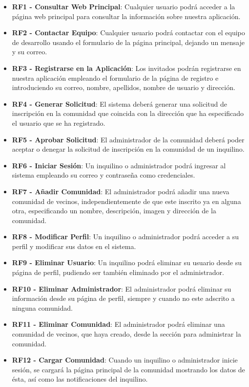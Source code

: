 \begin{itemize}
	\item \textbf{RF1 - Consultar Web Principal}: Cualquier usuario podrá acceder a la página web principal para consultar la información sobre nuestra aplicación.
	\item \textbf{RF2 - Contactar Equipo}: Cualquier usuario podrá contactar con el equipo de desarrollo usando el formulario de la página principal, dejando un mensaje y su correo.
	\item \textbf{RF3 - Registrarse en la Aplicación}: Los invitados podrán registrarse en nuestra aplicación empleando el formulario de la página de registro e introduciendo su correo, nombre, apellidos, nombre de usuario y dirección.
	\item \textbf{RF4 - Generar Solicitud}: El sistema deberá generar una solicitud de inscripción en la comunidad que coincida con la dirección que ha especificado el usuario que se ha registrado.
	\item \textbf{RF5 - Aprobar Solicitud}: El administrador de la comunidad deberá poder aceptar o denegar la solicitud de inscripción en la comunidad de un inquilino. 
	\item \textbf{RF6 - Iniciar Sesión}: Un inquilino o administrador podrá ingresar al sistema empleando su correo y contraseña como credenciales.
	\item \textbf{RF7 - Añadir Comunidad}: El administrador podrá añadir una nueva comunidad de vecinos, independientemente de que este inscrito ya en alguna otra, especificando un nombre, descripción, imagen y dirección de la comunidad.
	\item \textbf{RF8 - Modificar Perfil}: Un inquilino o administrador podrá acceder a su perfil y modificar sus datos en el sistema.
	\item \textbf{RF9 - Eliminar Usuario}: Un inquilino podrá eliminar su usuario desde su página de perfil, pudiendo ser también eliminado por el administrador.
	\item \textbf{RF10 - Eliminar Administrador}: El administrador podrá eliminar su información desde su página de perfil, siempre y cuando no este adscrito a ninguna comunidad.
	\item \textbf{RF11 - Eliminar Comunidad}: El administrador podrá eliminar una comunidad de vecinos, que haya creado, desde la sección para administrar la comunidad.
	\item \textbf{RF12 - Cargar Comunidad}: Cuando un inquilino o administrador inicie sesión, se cargará la página principal de la comunidad mostrando los datos de ésta, así como las notificaciones del inquilino.

\end{itemize}
